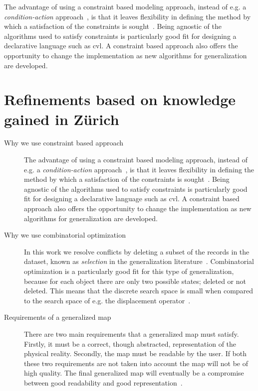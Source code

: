 \documentclass[11pt, oneside]{article}   	%
\begin{document}
The advantage of using a constraint based modeling approach, instead of e.g. a \emph{condition-action} approach~\cite{harrie2007modelling}, is that it leaves flexibility in defining the method by which a satisfaction of the constraints is sought~\cite{beard1991constraints}. Being agnostic of the algorithms used to satisfy constraints is particularly good fit for designing a declarative language such as cvl. A constraint based approach also offers the opportunity to change the implementation as new algorithms for generalization are developed.


\section{Refinements based on knowledge gained in Z\"{u}rich}

\begin{description}

\item[Why we use constraint based approach]

The advantage of using a constraint based modeling approach, instead of e.g. a \emph{condition-action} approach~\cite{harrie2007modelling}, is that it leaves flexibility in defining the method by which a satisfaction of the constraints is sought~\cite{beard1991constraints}. Being agnostic of the algorithms used to satisfy constraints is particularly good fit for designing a declarative language such as cvl. A constraint based approach also offers the opportunity to change the implementation as new algorithms for generalization are developed.

\item[Why we use combinatorial optimization] In this work we resolve conflicts by deleting a subset of the records in the dataset, known as \emph{selection} in the generalization literature~\cite{weibel1999generalising}. Combinatorial optimization is a particularly good fit for this type of generalization, because for each object there are only two possible states; deleted or not deleted. This means that the discrete search space is small when compared to the search space of e.g. the displacement operator~\cite{harrie2007modelling}.



\item[Requirements of a generalized map] There are two main requirements that a generalized map must satisfy. Firstly, it must be a correct, though abstracted, representation of the physical reality. Secondly, the map must be readable by the user. If both these two requirements are not taken into account the map will not be of high quality. The final generalized map will eventually be a compromise between good readability and good representation~\cite{harrie2007modelling}.


\end{description}
\end{document}
